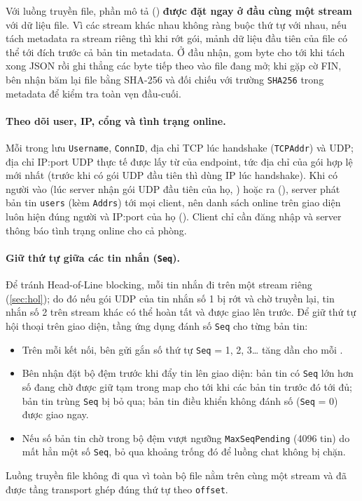 Với luồng truyền file, phần mô tả () \textbf{được đặt ngay ở đầu cùng một stream} với dữ liệu file.
Vì các stream khác nhau không ràng buộc thứ tự với nhau, nếu tách metadata ra stream riêng thì khi rớt gói, mảnh dữ
liệu đầu tiên của file có thể tới đích trước cả bản tin metadata. Ở đầu nhận,  gom byte cho
tới khi tách xong JSON  rồi ghi thẳng các byte tiếp theo vào file đang mở; khi gặp cờ FIN, bên nhận
băm lại file bằng SHA-256 và đối chiếu với trường \texttt{SHA256} trong metadata để kiểm tra toàn vẹn đầu-cuối.

\paragraph{Theo dõi user, IP, cổng và tình trạng online.} Mỗi  trong 
lưu \texttt{Username}, \texttt{ConnID}, địa chỉ TCP lúc handshake (\texttt{TCPAddr}) và  UDP; địa
chỉ IP:port UDP thực tế được lấy từ  của endpoint, tức địa chỉ của gói hợp lệ mới nhất (trước
khi có gói UDP đầu tiên thì dùng IP lúc handshake). Khi có người vào (lúc server nhận gói UDP đầu tiên của họ,
) hoặc ra (), server phát bản tin \texttt{users} (kèm \texttt{Addrs}) tới mọi
client, nên danh sách online trên giao diện luôn hiện đúng người và
IP:port của họ (). Client chỉ cần đăng nhập và server thông báo tình trạng online cho cả phòng.

\paragraph{Giữ thứ tự giữa các tin nhắn (\texttt{Seq}).} Để tránh Head-of-Line blocking, mỗi tin nhắn đi trên một
stream riêng (\cref{sec:hol}); do đó nếu gói UDP của tin nhắn số 1 bị rớt và chờ truyền lại, tin nhắn số 2 trên
stream khác có thể hoàn tất và được giao lên trước. Để giữ thứ tự hội thoại trên giao diện, tầng ứng dụng đánh số
\texttt{Seq} cho từng bản tin:
\begin{itemize}
  \item Trên mỗi kết nối, bên gửi gắn số thứ tự \texttt{Seq} = 1, 2, 3\dots{} tăng dần cho mỗi .
  \item Bên nhận đặt bộ đệm  trước khi đẩy tin lên giao diện: bản tin có \texttt{Seq} lớn
        hơn số đang chờ được giữ tạm trong map cho tới khi các bản tin trước đó tới đủ; bản tin trùng \texttt{Seq}
        bị bỏ qua; bản tin điều khiển không đánh số (\texttt{Seq} = 0) được giao ngay.
  \item Nếu số bản tin chờ trong bộ đệm vượt ngưỡng \texttt{MaxSeqPending} (4096 tin) do mất hẳn một số \texttt{Seq},
         bỏ qua khoảng trống đó để luồng chat không bị chặn.
\end{itemize}
Luồng truyền file không đi qua  vì toàn bộ file nằm trên cùng một stream và đã được tầng transport
ghép đúng thứ tự theo \texttt{offset}.


